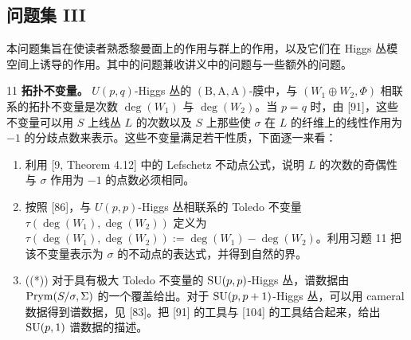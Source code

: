 
\subsection{问题集 III}

本问题集旨在使读者熟悉黎曼面上的作用与群上的作用，以及它们在 Higgs 丛模空间上诱导的作用。其中的问题兼收讲义中的问题与一些额外的问题。

\begin{prob}{11} \textbf{拓扑不变量。} $U(p,q)$-Higgs 丛的 $(\mathrm{B},\mathrm{A},\mathrm{A})$-膜中，与 $(W_1\oplus W_2,\Phi)$ 相联系的拓扑不变量是次数 $\deg(W_1)$ 与 $\deg(W_2)$。当 $p=q$ 时，由 [91]，这些不变量可以用 $S$ 上线丛 $L$ 的次数以及 $S$ 上那些使 $\sigma$ 在 $L$ 的纤维上的线性作用为 $-1$ 的分歧点数来表示。这些不变量满足若干性质，下面逐一来看：
\begin{enumerate}[label=(\roman*),leftmargin=2.2em]
\item 利用 [9, Theorem 4.12] 中的 Lefschetz 不动点公式，说明 $L$ 的次数的奇偶性与 $\sigma$ 作用为 $-1$ 的点数必须相同。
\item 按照 [86]，与 $U(p,p)$-Higgs 丛相联系的 Toledo 不变量 $\tau(\deg(W_1),\deg(W_2))$ 定义为 $\tau(\deg(W_1),\deg(W_2)) := \deg(W_1) - \deg(W_2)$。利用习题 11 把该不变量表示为 $\sigma$ 的不动点的表达式，并得到自然的界。
\item ((*)) 对于具有极大 Toledo 不变量的 $\mathrm{SU}(p,p)$-Higgs 丛，谱数据由 $\operatorname{Prym}(S/\sigma,\Sigma)$ 的一个覆盖给出。对于 $\mathrm{SU}(p,p+1)$-Higgs 丛，可以用 cameral 数据得到谱数据，见 [83]。把 [91] 的工具与 [104] 的工具结合起来，给出 $\mathrm{SU}(p,1)$ 谱数据的描述。
\end{enumerate}
\end{prob}

